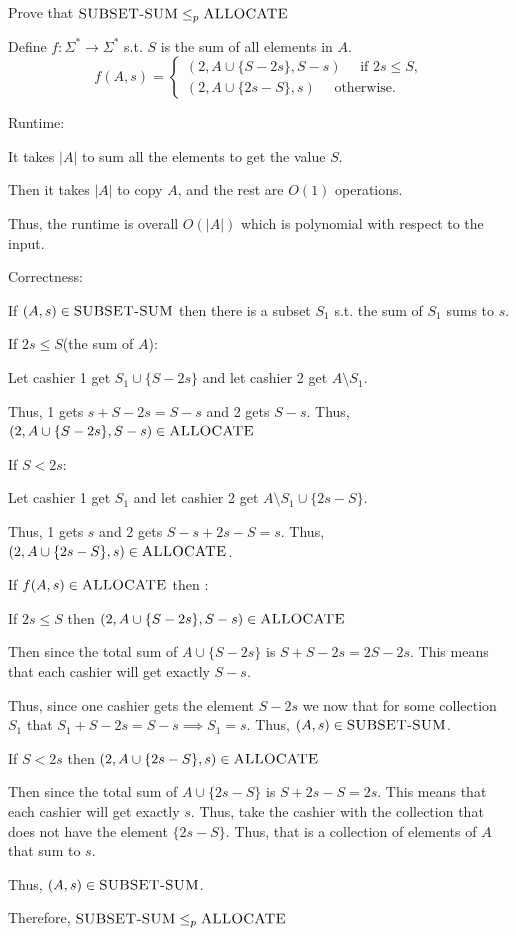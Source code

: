 \documentclass[12pt, letterpaper]{article}
\renewcommand{\t}[1]{\text{#1}}
\begin{document}
\newcommand{\SSUM}{\textsc{SUBSET-SUM}}
\begin{subproblem}{}
    Prove that $\SSUM \leq_p \textsc{ALLOCATE}$
\end{subproblem}
\begin{problemproof}
    Define $f : \Sigma^* \to \Sigma^*$ s.t. $S$ is the sum of all elements in $A$.
    \begin{equation*}
        f(A,s)=\begin{cases*}
            (2,A \cup \{S-2s\}, S-s) \quad \t{ if $2s \leq S$},\\
            (2,A \cup \{2s-S\}, s) \quad \t{ otherwise}.
        \end{cases*}
    \end{equation*}

    Runtime: 
    
    It takes $|A|$ to sum all the elements to get the value $S$.

    Then it takes $|A|$ to copy $A$, and the rest are $O(1)$ operations.

    Thus, the runtime is overall $O(|A|)$ which is polynomial with respect to the input.

    Correctness:

    If $(A,s) \in \SSUM$ then there is a subset $S_1$ s.t. the sum of $S_1$ sums to $s$.

    If $2s \leq S$(the sum of $A$): 
    
    Let cashier 1 get $S_1 \cup \{S-2s\}$ and let cashier 2 get $A \setminus S_1$.

    Thus, 1 gets $s+S-2s=S-s$ and 2 gets $S-s$. Thus, $(2,A \cup \{S-2s\}, S-s) \in \textsc{ALLOCATE}$

    If $S < 2s$:

    Let cashier 1 get $S_1$ and let cashier 2 get $A \setminus S_1 \cup \{2s-S\}$.

    Thus, 1 gets $s$ and 2 gets $S-s+2s-S=s$. Thus, $(2,A \cup \{2s-S\}, s) \in \textsc{ALLOCATE}$.

    If $f(A,s) \in \textsc{ALLOCATE}$ then :

    If $2s \leq S$ then $(2,A \cup \{S-2s\}, S-s) \in \textsc{ALLOCATE}$

    Then since the total sum of $A \cup \{S-2s\}$ is $S+S-2s=2S-2s$. This means that each cashier will get exactly $S-s$.

    Thus, since one cashier gets the element $S-2s$ we now that for some collection $S_1$ that $S_1 + S-2s=S-s \implies S_1 = s$. Thus, $(A,s) \in \SSUM$.

    If $S < 2s$ then $(2,A \cup \{2s-S\}, s) \in \textsc{ALLOCATE}$

    Then since the total sum of $A \cup \{2s-S\}$ is $S+2s-S=2s$. This means that each cashier will get exactly $s$. Thus, take the cashier with the collection that does not have the element $\{2s-S\}$. Thus, that is a collection of elements of $A$ that sum to $s$.

    Thus, $(A,s) \in \SSUM$.

    Therefore, $\SSUM \leq_p \textsc{ALLOCATE}$
\end{problemproof}
\end{document}
